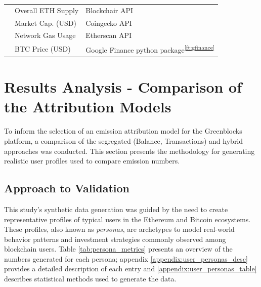\documentclass[11pt]{report}
\begin{document}
\begin{table}[h!]
\begin{tabular}{|c|l|l|}
                                  & Overall ETH Supply   & Blockchair API \cite{blockchairltdBlockchainAPIDocumentation}                                                      \\
                                  & Market Cap. (USD)    & Coingecko API \cite{coingeckoltdCryptoAPIDocumentation}                                                            \\
                                  & Network Gas Usage    & Etherscan API \cite{etherscanltdAPIDocumentation}                                                                  \\
                                  & BTC Price (USD)      & Google Finance python package\textsuperscript{\ref{ft:gfinance}}                                                   \\
        \hline
    \end{tabular}
\end{table}



\section{Results Analysis - Comparison of the Attribution Models \label{sec:results_analysis}}

To inform the selection of an emission attribution model for the Greenblocks platform, a comparison of the segregated (Balance, Transactions) and hybrid approaches was conducted. This section presents the methodology for generating realistic user profiles used to compare emission numbers.

\subsection{Approach to Validation \label{sec:approach_validation}}

This study's synthetic data generation was guided by the need to create representative profiles of typical users in the Ethereum and Bitcoin ecosystems. These profiles, also known as \textit{personas}, are archetypes to model real-world behavior patterns and investment strategies commonly observed among blockchain users. Table \ref{tab:persona_metrics} presents an overview of the numbers generated for each persona; appendix \ref{appendix:user_personas_desc} provides a detailed description of each entry and \ref{appendix:user_personas_table} describes statistical methods used to generate the data.
\end{document}
